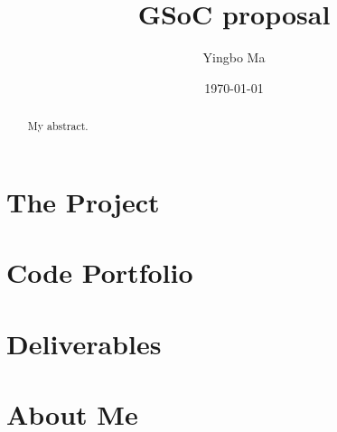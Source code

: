 \documentclass{article}
\author{Yingbo Ma}
\date{\today}
\title{GSoC proposal}
\begin{document}
\maketitle
\tableofcontents

\begin{abstract}
My abstract.
\end{abstract}

\section{The Project}






\section{Code Portfolio}

\section{Deliverables}


\section{About Me}


\end{document}

